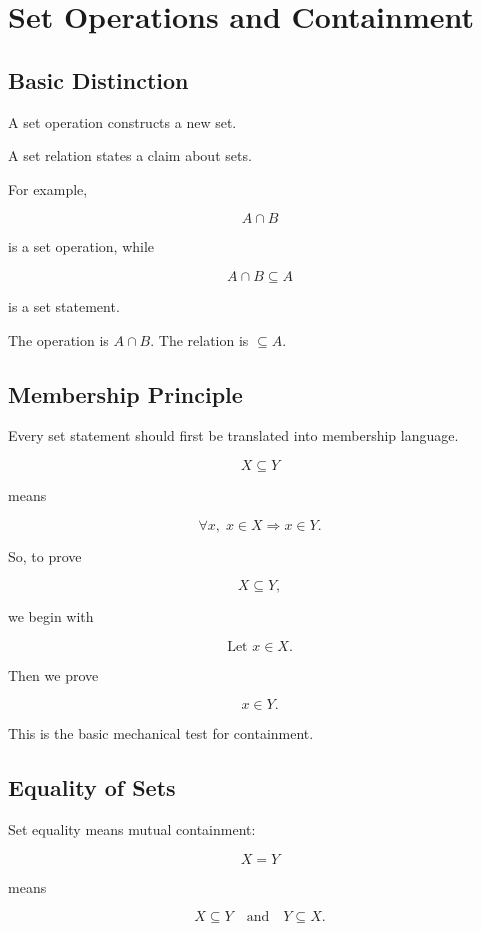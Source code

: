 \documentclass{article}
\begin{document}
	\section{Set Operations and Containment}
	
	\subsection{Basic Distinction}
	
	A set operation constructs a new set.
	
	A set relation states a claim about sets.
	
	For example,
	
	\[
	A \cap B
	\]
	
	is a set operation, while
	
	\[
	A \cap B \subseteq A
	\]
	
	is a set statement.
	
	The operation is \(A \cap B\). The relation is \(\subseteq A\).
	
	\subsection{Membership Principle}
	
	Every set statement should first be translated into membership language.
	
	\[
	X \subseteq Y
	\]
	
	means
	
	\[
	\forall x,\; x \in X \Rightarrow x \in Y.
	\]
	
	So, to prove
	
	\[
	X \subseteq Y,
	\]
	
	we begin with
	
	\[
	\text{Let } x \in X.
	\]
	
	Then we prove
	
	\[
	x \in Y.
	\]
	
	This is the basic mechanical test for containment.
	
	\subsection{Equality of Sets}
	
	Set equality means mutual containment:
	
	\[
	X = Y
	\]
	
	means
	
	\[
	X \subseteq Y
	\quad \text{and} \quad
	Y \subseteq X.
	\]
	
\end{document}

